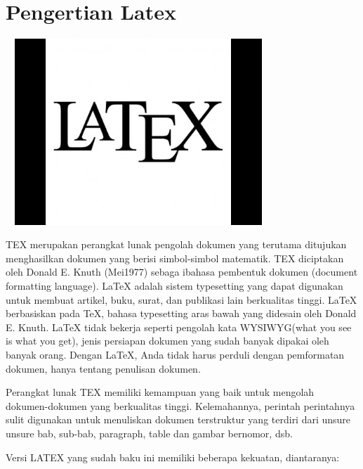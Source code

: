 \section {Pengertian Latex}\par
\includegraphics[width=10cm,height=7cm]{gambar/latex.jpg}\par
\vspace{12pt}
TEX merupakan perangkat lunak pengolah dokumen yang terutama ditujukan menghasilkan dokumen yang berisi simbol-simbol matematik. TEX diciptakan oleh Donald E. Knuth (Mei1977) sebaga ibahasa pembentuk dokumen (document formatting language). LaTeX adalah sistem typesetting yang 
dapat digunakan untuk membuat artikel, buku, surat, dan publikasi lain berkualitas tinggi. LaTeX berbasiskan pada TeX, bahasa typesetting aras bawah yang didesain oleh Donald E. Knuth. LaTeX tidak bekerja seperti pengolah kata WYSIWYG(what you see is what you get), jenis persiapan dokumen yang sudah banyak dipakai oleh banyak orang. Dengan LaTeX, Anda tidak harus perduli dengan pemformatan dokumen, hanya tentang penulisan dokumen.\par 
\vspace{12pt}

Perangkat lunak TEX memiliki kemampuan yang baik untuk mengolah dokumen-dokumen yang berkualitas tinggi. Kelemahannya, perintah perintahnya sulit digunakan untuk menuliskan dokumen terstruktur yang terdiri dari unsure unsure bab, sub-bab, paragraph, table dan gambar bernomor, dsb.\par 
\vspace{12pt}

Versi LATEX yang sudah baku ini memiliki beberapa kekuatan, diantaranya:

